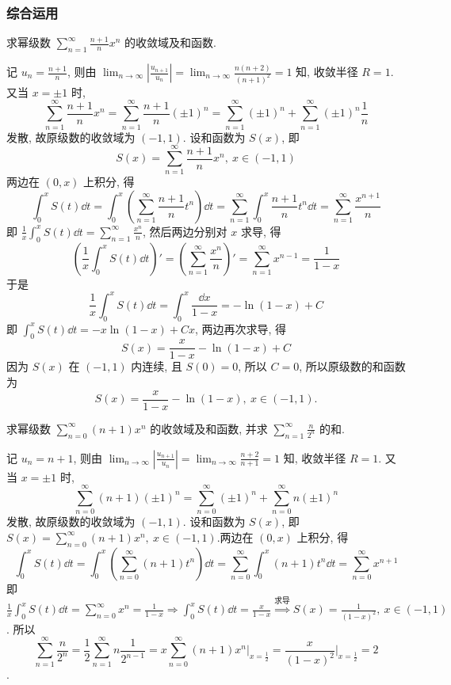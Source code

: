 \subsubsection{综合运用}

\begin{example}
    求幂级数 $\displaystyle\sum_{n=1}^\infty\frac{n+1}{n}x^n$ 的收敛域及和函数.
\end{example}
\begin{solution}
    记 $\displaystyle u_n=\frac{n+1}{n}$, 则由 $\displaystyle\lim_{n\to\infty}\left|\frac{u_{n+1}}{u_n}\right|=\lim_{n\to\infty}\frac{n(n+2)}{(n+1)^2}=1$ 知, 收敛半径 $R=1$.
    又当 $x=\pm 1$ 时,
    $$\displaystyle\sum_{n=1}^\infty\frac{n+1}{n}x^n=\sum_{n=1}^\infty\frac{n+1}{n}(\pm 1)^n=\sum_{n=1}^\infty(\pm 1)^n+\sum_{n=1}^\infty(\pm 1)^n\frac{1}{n}$$
    发散, 故原级数的收敛域为 $(-1,1)$.
    设和函数为 $S(x)$, 即 $$\displaystyle S(x)=\sum_{n=1}^\infty\frac{n+1}{n}x^n,~x\in(-1,1)$$
    两边在 $(0,x)$ 上积分, 得
    $$\int_0^xS(t)\dd t=\int_0^x\left(\sum_{n=1}^\infty\frac{n+1}{n}t^n\right)\dd t=\sum_{n=1}^\infty\int_0^x\frac{n+1}{n}t^n\dd t=\sum_{n=1}^\infty\frac{x^{n+1}}{n}$$
    即 $\displaystyle\frac{1}{x}\int_0^xS(t)\dd t=\sum_{n=1}^\infty\frac{x^n}{n}$, 然后两边分别对 $x$ 求导, 得
    $$\left(\frac{1}{x}\int_0^xS(t)\dd t\right)'=\left(\sum_{n=1}^\infty\frac{x^n}{n}\right)'=\sum_{n=1}^\infty x^{n-1}=\frac{1}{1-x}$$
    于是$$\frac{1}{x}\int_0^xS(t)\dd t=\int_0^x\frac{\dd x}{1-x}=-\ln(1-x)+C$$
    即 $\displaystyle\int_0^xS(t)\dd t=-x\ln(1-x)+Cx$, 两边再次求导, 得
    $$S(x)=\frac{x}{1-x}-\ln(1-x)+C$$
    因为 $S(x)$ 在 $(-1,1)$ 内连续, 且 $S(0)=0$, 所以 $C=0$, 所以原级数的和函数为
    $$S(x)=\frac{x}{1-x}-\ln(1-x),~x\in(-1,1).$$
\end{solution}

\begin{example}
    求幂级数 $\displaystyle\sum_{n=0}^\infty(n+1)x^n$ 的收敛域及和函数, 并求 $\displaystyle\sum_{n=1}^\infty\frac{n}{2^n}$ 的和.
\end{example}
\begin{solution}
    记 $u_n=n+1$, 则由 $\displaystyle\lim_{n\to\infty}\left|\frac{u_{n+1}}{u_n}\right|=\lim_{n\to\infty}\frac{n+2}{n+1}=1$ 知, 收敛半径 $R=1$.
    又当 $x=\pm 1$ 时, $$\displaystyle\sum_{n=0}^\infty(n+1)(\pm 1)^n=\sum_{n=0}^\infty(\pm 1)^n+\sum_{n=0}^\infty n(\pm 1)^n$$
    发散, 故原级数的收敛域为 $(-1,1)$. 设和函数为 $S(x)$, 即 $\displaystyle S(x)=\sum_{n=0}^\infty(n+1)x^n,~x\in(-1,1)$.两边在 $(0,x)$ 上积分, 得
    $$\int_0^xS(t)\dd t=\int_0^x\left(\sum_{n=0}^\infty(n+1)t^n\right)\dd t=\sum_{n=0}^\infty\int_0^x(n+1)t^n\dd t=\sum_{n=0}^\infty x^{n+1}$$
    即 $\displaystyle\frac{1}{x}\int_0^xS(t)\dd t=\sum_{n=0}^\infty x^n=\frac{1}{1-x}\Rightarrow \int_0^xS(t)\dd t=\frac{x}{1-x}\overset{\text{求导}}{\Rightarrow}S(x)=\frac{1}{(1-x)^2},~x\in(-1,1)$.
    所以 $$\displaystyle\sum_{n=1}^\infty\frac{n}{2^n}=\frac{1}{2}\sum_{n=1}^\infty n \frac{1}{2^{n-1}}=x\sum_{n=0}^\infty(n+1)x^n\Biggl |_{x=\frac{1}{2}}=\frac{x}{(1-x)^2}\Biggl |_{x=\frac{1}{2}}=2$$.
\end{solution}

